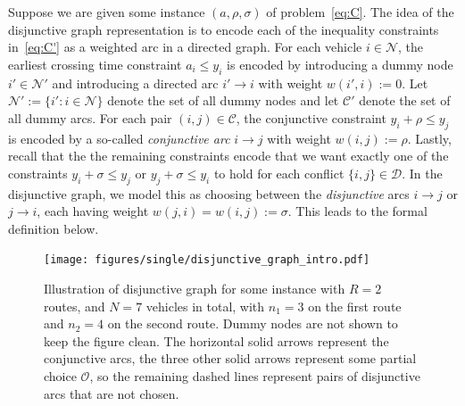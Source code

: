 \documentclass[a4paper]{report}
\theoremstyle{definition}
\theoremstyle{plain}
\begin{document}
Suppose we are given some instance $(a, \rho, \sigma)$ of
problem~\eqref{eq:C}.
%
The idea of the disjunctive graph representation is to encode each of the
inequality constraints in~\eqref{eq:C'} as a weighted arc in a directed graph.
%
For each vehicle $i \in \mathcal{N}$, the earliest crossing time constraint
  $a_i \leq y_i$
is encoded by introducing a dummy node $i' \in \mathcal{N}'$ and introducing a
directed arc $i' \rightarrow i$ with weight $w(i', i) := 0$.
%
Let $\mathcal{N}' := \{ i' : i \in \mathcal{N}\}$ denote the set of all dummy
nodes and let $\mathcal{C}'$ denote the set of all dummy arcs.
%
For each pair $(i,j) \in \mathcal{C}$, the conjunctive constraint
  $y_i + \rho \leq y_j$
is encoded by a so-called \emph{conjunctive arc} $i \rightarrow j$ with weight
$w(i,j) := \rho$.
%
Lastly, recall that the the remaining constraints encode that we want exactly
one of the constraints $y_i + \sigma \leq y_j$ or $y_j + \sigma \leq y_i$ to
hold for each conflict $\{i,j\} \in \mathcal{D}$.
%
In the disjunctive graph, we model this as choosing between the
\emph{disjunctive} arcs $i \rightarrow j$ or $j \rightarrow i$, each having
weight $w(j,i) = w(i,j) := \sigma$.
%
This leads to the formal definition below.

\begin{figure}
  \centering
  \texttt{[image: figures/single/disjunctive\_graph\_intro.pdf]}
  \caption{Illustration of disjunctive graph for some instance with $R=2$
    routes, and $N=7$ vehicles in total, with $n_{1} = 3$ on the first route and
    $n_{2} = 4$ on the second route. Dummy nodes are not shown to keep the
    figure clean. The horizontal solid arrows represent the conjunctive arcs,
    the three other solid arrows represent some partial choice $\mathcal{O}$, so
    the remaining dashed lines represent pairs of disjunctive arcs that are not
    chosen.}\label{fig:disjunctive-graph-intro}
\end{figure}
\end{document}
